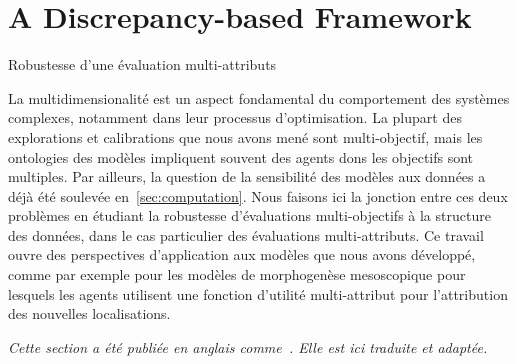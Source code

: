 
\newpage

\section{A Discrepancy-based Framework}{Robustesse d'une évaluation multi-attributs}


\label{app:sec:robustness}




La multidimensionalité est un aspect fondamental du comportement des systèmes complexes, notamment dans leur processus d'optimisation. La plupart des explorations et calibrations que nous avons mené sont multi-objectif, mais les ontologies des modèles impliquent souvent des agents dons les objectifs sont multiples. Par ailleurs, la question de la sensibilité des modèles aux données a déjà été soulevée en~\ref{sec:computation}. Nous faisons ici la jonction entre ces deux problèmes en étudiant la robustesse d'évaluations multi-objectifs à la structure des données, dans le cas particulier des évaluations multi-attributs. Ce travail ouvre des perspectives d'application aux modèles que nous avons développé, comme par exemple pour les modèles de morphogenèse mesoscopique pour lesquels les agents utilisent une fonction d'utilité multi-attribut pour l'attribution des nouvelles localisations.



\stars



\textit{Cette section a été publiée en anglais comme~\cite{raimbault2017discrepancy}. Elle est ici traduite et adaptée.}


\stars


